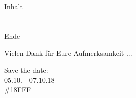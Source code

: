\documentclass[12pt,hyperref={pdfpagelabels=false},notes=show,aspectratio=169]{beamer}
\begin{document}

\begin{frame}{Inhalt}
    \hspace{0.1\textwidth}
    \parbox[c][0.8\textheight][s]{0.8\textwidth}{
        \tableofcontents
    }
\end{frame}









\section*{}
\begin{frame}{Ende}
    \begin{center}
        Vielen Dank für Eure Aufmerksamkeit	...

        \vfill

        Save the date:\\
        05.10. - 07.10.18\\
        \#18FFF
     \end{center}
\end{frame}\addtocounter{framenumber}{-1}
	
\end{document}
